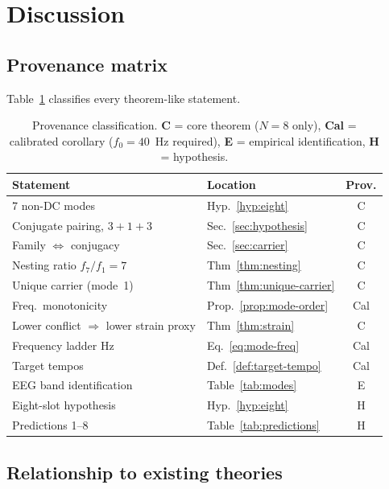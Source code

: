 \documentclass[11pt,a4paper]{article}
\begin{document}
\section{Discussion}
\label{sec:discussion}

\subsection{Provenance matrix}

Table~\ref{tab:provenance} classifies every theorem-like statement.

\begin{table}[H]
\centering\small
\caption{Provenance classification.  \textbf{C} = core theorem
($N=8$ only), \textbf{Cal} = calibrated corollary
($f_0 = 40$~Hz required), \textbf{E} = empirical identification,
\textbf{H} = hypothesis.}
\label{tab:provenance}
\begin{tabular}{@{}llc@{}}
\toprule
\textbf{Statement} & \textbf{Location} & \textbf{Prov.} \\
\midrule
7 non-DC modes & Hyp.~\ref{hyp:eight} & C \\
Conjugate pairing, $3{+}1{+}3$ & Sec.~\ref{sec:hypothesis} & C \\
Family $\Leftrightarrow$ conjugacy & Sec.~\ref{sec:carrier} & C \\
Nesting ratio $f_7/f_1 = 7$ & Thm~\ref{thm:nesting} & C \\
Unique carrier (mode~1) & Thm~\ref{thm:unique-carrier} & C \\
Freq.\ monotonicity & Prop.~\ref{prop:mode-order} & Cal \\
Lower conflict $\Rightarrow$ lower strain proxy & Thm~\ref{thm:strain} & C \\
\midrule
Frequency ladder Hz & Eq.~\ref{eq:mode-freq} & Cal \\
Target tempos & Def.~\ref{def:target-tempo} & Cal \\
EEG band identification & Table~\ref{tab:modes} & E \\
\midrule
Eight-slot hypothesis & Hyp.~\ref{hyp:eight} & H \\
Predictions 1--8 & Table~\ref{tab:predictions} & H \\
\bottomrule
\end{tabular}
\end{table}

\subsection{Relationship to existing theories}
\end{document}
